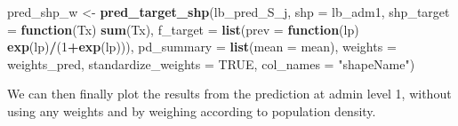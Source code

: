 \documentclass[
  letterpaper,
]{krantz}
\newenvironment{Shaded}{\begin{snugshade}}{\end{snugshade}}
\newcommand{\AttributeTok}[1]{\textcolor[rgb]{0.13,0.29,0.53}{#1}}
\newcommand{\ConstantTok}[1]{\textcolor[rgb]{0.56,0.35,0.01}{#1}}
\newcommand{\ControlFlowTok}[1]{\textcolor[rgb]{0.13,0.29,0.53}{\textbf{#1}}}
\newcommand{\DecValTok}[1]{\textcolor[rgb]{0.00,0.00,0.81}{#1}}
\newcommand{\FunctionTok}[1]{\textcolor[rgb]{0.13,0.29,0.53}{\textbf{#1}}}
\newcommand{\NormalTok}[1]{#1}
\newcommand{\OtherTok}[1]{\textcolor[rgb]{0.56,0.35,0.01}{#1}}
\newcommand{\SpecialCharTok}[1]{\textcolor[rgb]{0.81,0.36,0.00}{\textbf{#1}}}
\newcommand{\StringTok}[1]{\textcolor[rgb]{0.31,0.60,0.02}{#1}}
\begin{document}
\begin{Shaded}
\begin{Highlighting}[]
\NormalTok{pred\_shp\_w }\OtherTok{\textless{}{-}} \FunctionTok{pred\_target\_shp}\NormalTok{(lb\_pred\_S\_j, }\AttributeTok{shp =}\NormalTok{ lb\_adm1,}
                            \AttributeTok{shp\_target =} \ControlFlowTok{function}\NormalTok{(Tx) }\FunctionTok{sum}\NormalTok{(Tx),}
                            \AttributeTok{f\_target =} \FunctionTok{list}\NormalTok{(}\AttributeTok{prev =} 
                                       \ControlFlowTok{function}\NormalTok{(lp) }\FunctionTok{exp}\NormalTok{(lp)}\SpecialCharTok{/}\NormalTok{(}\DecValTok{1}\SpecialCharTok{+}\FunctionTok{exp}\NormalTok{(lp))),}
                            \AttributeTok{pd\_summary =} \FunctionTok{list}\NormalTok{(}\AttributeTok{mean =}\NormalTok{ mean),}
                            \AttributeTok{weights =}\NormalTok{ weights\_pred,}
                            \AttributeTok{standardize\_weights =} \ConstantTok{TRUE}\NormalTok{,}
                            \AttributeTok{col\_names =} \StringTok{"shapeName"}\NormalTok{)}
\end{Highlighting}
\end{Shaded}

We can then finally plot the results from the prediction at admin level
1, without using any weights and by weighing according to population
density.
\end{document}
